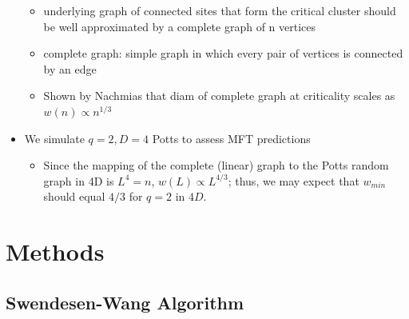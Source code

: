 \documentclass{umthesis}          %
\begin{document}
\begin{itemize}
\begin{itemize}
\item underlying graph of connected sites that form the critical cluster should be well approximated by a complete graph of n vertices\\
\label{sec-4.1.3.5.2}


\item complete graph:  simple graph in which every pair of vertices is connected by an edge\\
\label{sec-4.1.3.5.3}


\item Shown by Nachmias \cite{Nachmiasa} that diam of complete graph at criticality scales as $w(n) \propto n^{1/3}$\\
\label{sec-4.1.3.5.4}

\end{itemize} %

\item We simulate $q=2, D=4$ Potts to assess MFT predictions\\
\label{sec-4.1.3.6}

\begin{itemize}

\item Since the mapping of the complete (linear) graph to the Potts random graph in 4D is $L^4=n$, $w(L) \propto L^{4/3}$; thus, we may expect that $w_{min}$ should equal $4/3$ for $q=2$ in $4D$.\\
\label{sec-4.1.3.6.1}

\end{itemize} %
\end{itemize} %
\section{Methods}
\label{sec-4.2}

\subsection{Swendesen-Wang Algorithm}
\label{sec-4.2.1}
\end{document}
